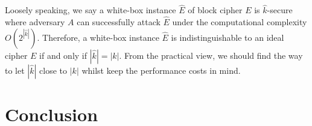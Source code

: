 \documentclass{SCIS2018}
\begin{document}
Loosely speaking, we say a white-box instance $\hat{E}$ of block cipher $E$ is $\hat{k}$-secure where adversary $A$ can successfully attack $\hat{E}$ under the computational complexity $O(2^{|\hat{k}|})$. Therefore, a white-box instance $\hat{E}$ is indistinguishable to an ideal cipher $E$ if and only if $|\hat{k}| = |k|$. From the practical view, we should find the way to let $|\hat{k}|$ close to $|k|$ whilst keep the performance costs in mind.



\section{Conclusion}








\end{document}
